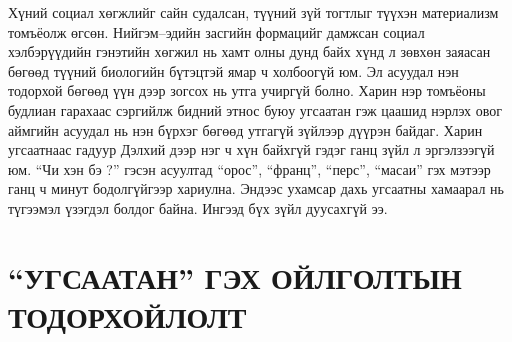 Хүний социал хөгжлийг сайн судалсан, түүний зүй тогтлыг түүхэн материализм томъёолж өгсөн. Нийгэм–эдийн засгийн формацийг дамжсан социал хэлбэрүүдийн гэнэтийн хөгжил нь хамт олны дунд байх хүнд л зөвхөн заяасан бөгөөд түүний биологийн бүтэцтэй ямар ч холбоогүй юм. Эл асуудал нэн тодорхой бөгөөд үүн дээр зогсох нь утга учиргүй болно. Харин нэр томъёоны будлиан гарахаас сэргийлж бидний этнос буюу угсаатан гэж цаашид нэрлэх овог аймгийн асуудал нь нэн бүрхэг бөгөөд утгагүй зүйлээр дүүрэн байдаг. Харин угсаатнаас гадуур Дэлхий дээр нэг ч хүн байхгүй гэдэг ганц зүйл л эргэлзээгүй юм. “Чи хэн бэ ?” гэсэн асуултад “орос”, “франц”, “перс”, “масаи” гэх мэтээр ганц ч минут бодолгүйгээр хариулна. Эндээс ухамсар дахь угсаатны хамаарал нь түгээмэл үзэгдэл болдог байна. Ингээд бүх зүйл дуусахгүй ээ.

\section*{“УГСААТАН” ГЭХ ОЙЛГОЛТЫН ТОДОРХОЙЛОЛТ}

